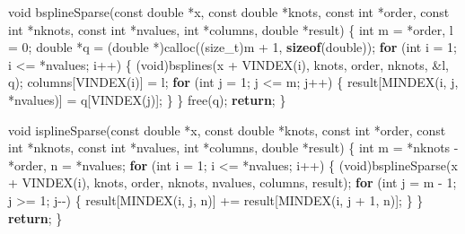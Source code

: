 \documentclass[
  12pt,
]{book}
\newenvironment{Shaded}{\begin{snugshade}}{\end{snugshade}}
\newcommand{\ControlFlowTok}[1]{\textcolor[rgb]{0.13,0.29,0.53}{\textbf{#1}}}
\newcommand{\DataTypeTok}[1]{\textcolor[rgb]{0.13,0.29,0.53}{#1}}
\newcommand{\DecValTok}[1]{\textcolor[rgb]{0.00,0.00,0.81}{#1}}
\newcommand{\KeywordTok}[1]{\textcolor[rgb]{0.13,0.29,0.53}{\textbf{#1}}}
\newcommand{\NormalTok}[1]{#1}
\theoremstyle{definition}
\theoremstyle{definition}
\theoremstyle{definition}
\theoremstyle{definition}
\theoremstyle{remark}
\begin{document}
\begin{Shaded}
\begin{Highlighting}[]
\DataTypeTok{void}\NormalTok{ bsplineSparse(}\DataTypeTok{const} \DataTypeTok{double}\NormalTok{ *x, }\DataTypeTok{const} \DataTypeTok{double}\NormalTok{ *knots, }\DataTypeTok{const} \DataTypeTok{int}\NormalTok{ *order,}
                   \DataTypeTok{const} \DataTypeTok{int}\NormalTok{ *nknots, }\DataTypeTok{const} \DataTypeTok{int}\NormalTok{ *nvalues, }\DataTypeTok{int}\NormalTok{ *columns,}
                   \DataTypeTok{double}\NormalTok{ *result) \{}
    \DataTypeTok{int}\NormalTok{ m = *order, l = }\DecValTok{0}\NormalTok{;}
    \DataTypeTok{double}\NormalTok{ *q = (}\DataTypeTok{double}\NormalTok{ *)calloc((}\DataTypeTok{size\_t}\NormalTok{)m + }\DecValTok{1}\NormalTok{, }\KeywordTok{sizeof}\NormalTok{(}\DataTypeTok{double}\NormalTok{));}
    \ControlFlowTok{for}\NormalTok{ (}\DataTypeTok{int}\NormalTok{ i = }\DecValTok{1}\NormalTok{; i \textless{}= *nvalues; i++) \{}
\NormalTok{        (}\DataTypeTok{void}\NormalTok{)bsplines(x + VINDEX(i), knots, order, nknots, \&l, q);}
\NormalTok{        columns[VINDEX(i)] = l;}
        \ControlFlowTok{for}\NormalTok{ (}\DataTypeTok{int}\NormalTok{ j = }\DecValTok{1}\NormalTok{; j \textless{}= m; j++) \{}
\NormalTok{            result[MINDEX(i, j, *nvalues)] = q[VINDEX(j)];}
\NormalTok{        \}}
\NormalTok{    \}}
\NormalTok{    free(q);}
    \ControlFlowTok{return}\NormalTok{;}
\NormalTok{\}}

\DataTypeTok{void}\NormalTok{ isplineSparse(}\DataTypeTok{const} \DataTypeTok{double}\NormalTok{ *x, }\DataTypeTok{const} \DataTypeTok{double}\NormalTok{ *knots, }\DataTypeTok{const} \DataTypeTok{int}\NormalTok{ *order,}
                   \DataTypeTok{const} \DataTypeTok{int}\NormalTok{ *nknots, }\DataTypeTok{const} \DataTypeTok{int}\NormalTok{ *nvalues, }\DataTypeTok{int}\NormalTok{ *columns,}
                   \DataTypeTok{double}\NormalTok{ *result) \{}
    \DataTypeTok{int}\NormalTok{ m = *nknots {-} *order, n = *nvalues;}
    \ControlFlowTok{for}\NormalTok{ (}\DataTypeTok{int}\NormalTok{ i = }\DecValTok{1}\NormalTok{; i \textless{}= *nvalues; i++) \{}
\NormalTok{        (}\DataTypeTok{void}\NormalTok{)bsplineSparse(x + VINDEX(i), knots, order, nknots, nvalues,}
\NormalTok{                            columns, result);}
        \ControlFlowTok{for}\NormalTok{ (}\DataTypeTok{int}\NormalTok{ j = m {-} }\DecValTok{1}\NormalTok{; j \textgreater{}= }\DecValTok{1}\NormalTok{; j{-}{-}) \{}
\NormalTok{            result[MINDEX(i, j, n)] += result[MINDEX(i, j + }\DecValTok{1}\NormalTok{, n)];}
\NormalTok{        \}}
\NormalTok{    \}}
    \ControlFlowTok{return}\NormalTok{;}
\NormalTok{\}}
\end{Highlighting}
\end{Shaded}
\end{document}
